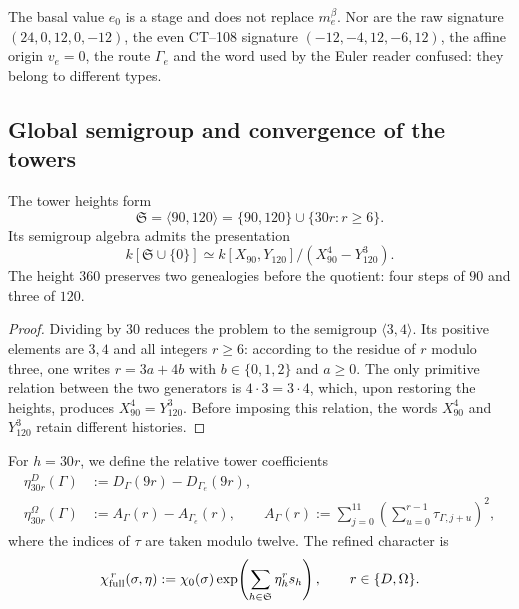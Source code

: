 The basal value \(e_0\) is a stage and does not replace \(m_e^\beta\). Nor are the raw signature \((24,0,12,0,-12)\), the even CT--108 signature \((-12,-4,12,-6,12)\), the affine origin \(v_e=0\), the route \(\Gamma_e\) and the word used by the Euler reader confused: they belong to different types.

\subsection{Global semigroup and convergence of the towers}

\begin{theorem}
\label{10j-thm-semigrupo}
The tower heights form
\begin{equation}
 \mathfrak S=\langle90,120\rangle
 =\{90,120\}\cup\{30r:r\ge6\}.
 \label{10j-eq-semigrupo}
\end{equation}
Its semigroup algebra admits the presentation
\begin{equation}
 k[\mathfrak S\cup\{0\}]
 \simeq k[X_{90},Y_{120}]/(X_{90}^4-Y_{120}^3).
 \label{10j-eq-algebra-semigrupo}
\end{equation}
The height \(360\) preserves two genealogies before the quotient: four steps of \(90\) and three of \(120\).
\end{theorem}

\begin{proof}
Dividing by \(30\) reduces the problem to the semigroup \(\langle3,4\rangle\). Its positive elements are \(3,4\) and all integers \(r\ge6\): according to the residue of \(r\) modulo three, one writes \(r=3a+4b\) with \(b\in\{0,1,2\}\) and \(a\ge0\). The only primitive relation between the two generators is \(4\cdot3=3\cdot4\), which, upon restoring the heights, produces \(X_{90}^4=Y_{120}^3\). Before imposing this relation, the words \(X_{90}^4\) and \(Y_{120}^3\) retain different histories.
\end{proof}

For \(h=30r\), we define the relative tower coefficients
\begin{align}
 \eta_{30r}^D(\Gamma)
 &:=D_\Gamma(9r)-D_{\Gamma_e}(9r),
 \label{10j-eq-eta-d}\\
 \eta_{30r}^\Omega(\Gamma)
 &:=A_\Gamma(r)-A_{\Gamma_e}(r),
 \qquad
 A_\Gamma(r):=
 \sum_{j=0}^{11}
 \left(\sum_{u=0}^{r-1}\tau_{\Gamma,j+u}\right)^2,
 \label{10j-eq-eta-omega}
\end{align}
where the indices of \(\tau\) are taken modulo twelve. The refined character is
\begin{equation}
 \chi_{\rm full}^{\,r}(\sigma,\eta)
 :=\chi_0(\sigma)
 \exp\!\left(\sum_{h\in\mathfrak S}\eta_h^r s_h\right),
 \qquad r\in\{D,\Omega\}.
 \label{10j-eq-caracter-full}
\end{equation}

